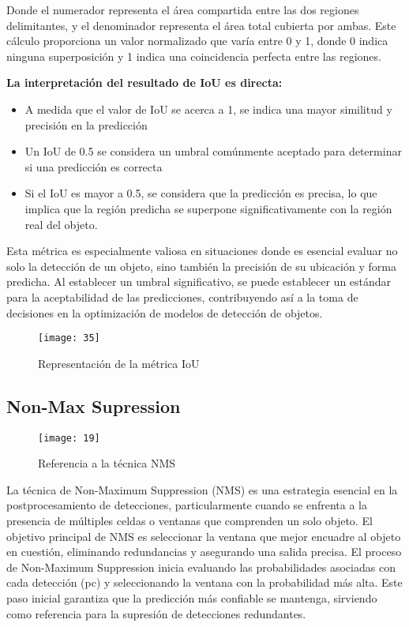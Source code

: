 	Donde el numerador representa el área compartida entre las dos regiones delimitantes, y el denominador representa el área total cubierta por ambas. Este cálculo proporciona un valor normalizado que varía entre 0 y 1, donde 0 indica ninguna superposición y 1 indica una coincidencia perfecta entre las regiones.
	
	\vspace{0.3cm}
	
	\textbf{La interpretación del resultado de IoU es directa:} 
	\begin{itemize}
	\item A medida que el valor de IoU se acerca a 1, se indica una mayor similitud y precisión en la predicción
	\item Un IoU de 0.5 se considera un umbral comúnmente aceptado para determinar si una predicción es correcta
	\item Si el IoU es mayor a 0.5, se considera que la predicción es precisa, lo que implica que la región predicha se superpone significativamente con la región real del objeto.
	
	\end{itemize}		

	Esta métrica es especialmente valiosa en situaciones donde es esencial evaluar no solo la detección de un objeto, sino también la precisión de su ubicación y forma predicha. Al establecer un umbral significativo, se puede establecer un estándar para la aceptabilidad de las predicciones, contribuyendo así a la toma de decisiones en la optimización de modelos de detección de objetos.

	\begin{figure}[ht]
	    \centering
		\texttt{[image: 35]}
		\caption{Representación de la métrica IoU}
	\end{figure}

	\subsection{Non-Max Supression}

	\begin{wrapfigure}[16]{R}{.42\textwidth} 
		\centering
		\texttt{[image: 19]}
		\caption{Referencia a la técnica NMS}
	\end{wrapfigure}
	
	La técnica de Non-Maximum Suppression (NMS) es una estrategia esencial en la postprocesamiento de detecciones, particularmente cuando se enfrenta a la presencia de múltiples celdas o ventanas que comprenden un solo objeto. El objetivo principal de NMS es seleccionar la ventana que mejor encuadre al objeto en cuestión, eliminando redundancias y asegurando una salida precisa.
El proceso de Non-Maximum Suppression inicia evaluando las probabilidades asociadas con cada detección (pc) y seleccionando la ventana con la probabilidad más alta. Este paso inicial garantiza que la predicción más confiable se mantenga, sirviendo como referencia para la supresión de detecciones redundantes.
	
